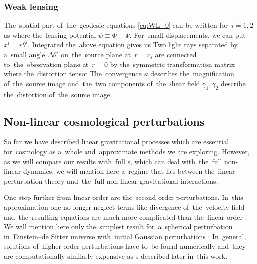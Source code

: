 \subsubsection{Weak lensing}
The~spatial part of~the~geodesic equations \eqref{eq:WL_0} can be written for~$i=1,2$ as
where the~lensing potential $\psi\equiv\Phi-\Psi$. For~small displacements, we can put $x^i=r\theta^i$. Integrated the~above equation gives us
Two light rays separated by a~small angle  $\Delta\theta^i$ on~the~source plane at~$r=r_s$ are connected to~the~observation plane at~$r=0$ by the~symmetric transformation matrix
where the~distortion tensor
The~convergence $\kappa$ describes the~magnification of~the~source image and~the~two components of~the~shear field $\gamma_1,\gamma_2$ describe the~distortion of~the~source image.
\subsection{Non-linear cosmological perturbations}
So far we have described linear gravitational processes which are essential for~cosmology as a~whole and~approximate methods we are exploring. However, as we will compare our results with~full \nbodysim s, which can deal with~the~full non-linear dynamics, we will mention here a~regime that lies between the~linear perturbation theory and~the~full non-linear gravitational interactions.

One step further from linear order are the~second-order perturbations. In~this approximation one no longer neglect terms like divergence of~the~velocity field and~the~resulting equations are much more complicated than the~linear order \textcite[see e.g.][]{2004astro.ph.12025T,10.1093/mnras/264.2.375,2010deto.book.....A}. We will mention here only the~simplest result for~a~spherical perturbation in~Einstein--de Sitter universe with~initial Gaussian perturbations \textcite{1980_Peebles}:
In~general, solutions of~higher-order perturbations have to~be found numerically and~they are computationally similarly expensive as \nbodysim s described later in~this work.

